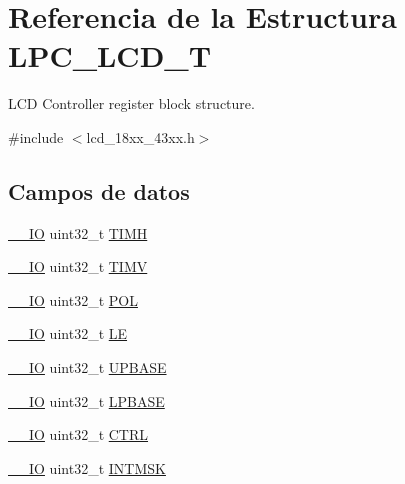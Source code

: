 \hypertarget{struct_l_p_c___l_c_d___t}{}\section{Referencia de la Estructura L\+P\+C\+\_\+\+L\+C\+D\+\_\+T}
\label{struct_l_p_c___l_c_d___t}


L\+CD Controller register block structure.  




{\ttfamily \#include $<$lcd\+\_\+18xx\+\_\+43xx.\+h$>$}

\subsection*{Campos de datos}
\begin{DoxyCompactItemize}
\item 
\hyperlink{core__sc300_8h_aec43007d9998a0a0e01faede4133d6be}{\+\_\+\+\_\+\+IO} uint32\+\_\+t \hyperlink{struct_l_p_c___l_c_d___t_ad6a543c03e5f15efbde1aadd082d1857}{T\+I\+MH}
\item 
\hyperlink{core__sc300_8h_aec43007d9998a0a0e01faede4133d6be}{\+\_\+\+\_\+\+IO} uint32\+\_\+t \hyperlink{struct_l_p_c___l_c_d___t_a9a5144cc60b76ed64885655d40326bbb}{T\+I\+MV}
\item 
\hyperlink{core__sc300_8h_aec43007d9998a0a0e01faede4133d6be}{\+\_\+\+\_\+\+IO} uint32\+\_\+t \hyperlink{struct_l_p_c___l_c_d___t_a9037a11797290aef4ac48048c07e2e89}{P\+OL}
\item 
\hyperlink{core__sc300_8h_aec43007d9998a0a0e01faede4133d6be}{\+\_\+\+\_\+\+IO} uint32\+\_\+t \hyperlink{struct_l_p_c___l_c_d___t_a69fb257295a9a84932b30501743003c2}{LE}
\item 
\hyperlink{core__sc300_8h_aec43007d9998a0a0e01faede4133d6be}{\+\_\+\+\_\+\+IO} uint32\+\_\+t \hyperlink{struct_l_p_c___l_c_d___t_aa81e6a99ad0ba1e40cf9fe99d20a97e3}{U\+P\+B\+A\+SE}
\item 
\hyperlink{core__sc300_8h_aec43007d9998a0a0e01faede4133d6be}{\+\_\+\+\_\+\+IO} uint32\+\_\+t \hyperlink{struct_l_p_c___l_c_d___t_a08137395313747cdc86061a6b242a4ca}{L\+P\+B\+A\+SE}
\item 
\hyperlink{core__sc300_8h_aec43007d9998a0a0e01faede4133d6be}{\+\_\+\+\_\+\+IO} uint32\+\_\+t \hyperlink{struct_l_p_c___l_c_d___t_a15fc8d35f045f329b80c544bef35ff64}{C\+T\+RL}
\item 
\hyperlink{core__sc300_8h_aec43007d9998a0a0e01faede4133d6be}{\+\_\+\+\_\+\+IO} uint32\+\_\+t \hyperlink{struct_l_p_c___l_c_d___t_af1cda4ad5dfe8311da11f696c33a10c8}{I\+N\+T\+M\+SK}

\end{DoxyCompactItemize}
